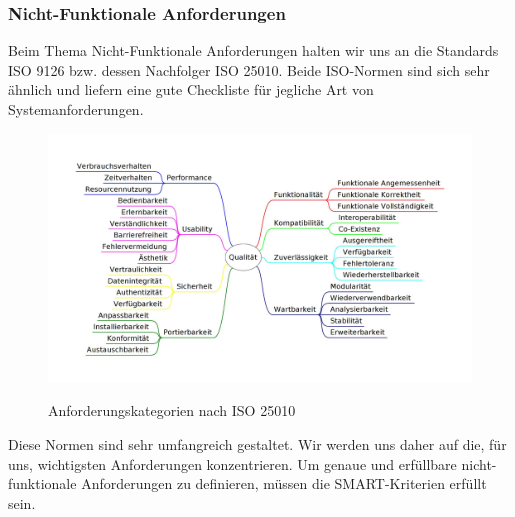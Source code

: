 \subsubsection{Nicht-Funktionale Anforderungen}
Beim Thema Nicht-Funktionale Anforderungen halten wir uns an die Standards ISO 9126\cite{ISO9126} bzw. dessen Nachfolger ISO 25010\cite{ISO9126_ISO25010}. Beide ISO-Normen sind sich sehr ähnlich und liefern eine gute Checkliste für jegliche Art von Systemanforderungen.

\begin{figure}[h]
	\centering
	\includegraphics[width=1\linewidth]{img/anforderungen/quality}
	\caption[Anforderungskategorien nach ISO 25010]{Anforderungskategorien nach  ISO 25010}\cite{ISO25010_Bild}
	\label{fig:ISO 25010}
\end{figure}

Diese Normen sind sehr umfangreich gestaltet. Wir werden uns daher auf die, für uns, wichtigsten Anforderungen konzentrieren. Um genaue und erfüllbare nicht-funktionale Anforderungen zu definieren, müssen die SMART-Kriterien \cite{SMART} erfüllt sein. 

